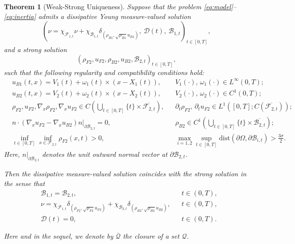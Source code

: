 \documentclass[11pt,twoside,reqno]{amsart}
\numberwithin{equation}{section}
\numberwithin{figure}{section}
\newtheorem{theorem}{Theorem}[section]
\begin{document}
\begin{theorem}[Weak-Strong Uniqueness]\label{thm:Weak-strongUniqueness}
Suppose that the problem \eqref{eq:model}–\eqref{eq:inertia} admits a dissipative Young measure-valued solution 
\[
(\nu=\chi_{\mathcal{F}_{1,t}}\nu+\chi_{\mathcal{B}_{1,t}}\delta_{(\rho_{B1},\sqrt{\rho_{B1}}u_{B1})},~\mathcal{D}(t),~\mathcal{B}_{1,t})_{t\in[0,T]},
\]
and a strong solution 
\[
(\rho_{F2},u_{F2},\rho_{B2},u_{B2},\mathcal{B}_{2,t})_{t\in[0,T]},
\]
such that the following regularity and compatibility conditions hold:
\begin{equation}\label{eq:RestrictontestforstrongSolution}
\begin{aligned}
&u_{B1}(t,x)=V_1(t)+\omega_1(t)\times(x-X_1(t)), 
&&V_1(\cdot),\,\omega_1(\cdot)\in L^\infty(0,T);\\
&u_{B2}(t,x)=V_2(t)+\omega_2(t)\times(x-X_2(t)), 
&&V_2(\cdot),\,\omega_2(\cdot)\in C^1(0,T);\\
&\rho_{F2},u_{F2},\nabla_x\rho_{F2},\nabla_xu_{F2}\in C\!\left(\bigcup_{t\in[0,T]}\{t\}\times\overline{\mathcal{F}_{2,t}}\right), 
&&\partial_t\rho_{F2},\,\partial_tu_{F2}\in L^1\!\left([0,T];C(\overline{\mathcal{F}_{2,t}})\right);\\
&n\cdot(\nabla_xu_{F2}-\nabla_xu_{B2}) n\big|_{\partial\mathcal{B}_{2,t}}=0, 
&&\rho_{B2}\in C^1\!\left(\bigcup_{t\in[0,T]}\{t\}\times\overline{\mathcal{B}_{2,t}}\right);\\
&\inf_{t\in[0,T]}\inf_{x\in\mathcal{F}_{2,t}}\rho_{F2}(x,t)>0, 
&&\max_{i=1,2}\sup_{t\in[0,T]}\mathrm{dist}(\partial\Omega,\partial\mathcal{B}_{i,t})>\tfrac{3\sigma}{2}.
\end{aligned}
\end{equation}
Here, $n|_{\partial\mathcal{B}_{2,t}}$ denotes the unit outward normal vector at $\partial\mathcal{B}_{2,t}$.  

Then the dissipative measure-valued solution coincides with the strong solution in the sense that
\begin{equation}
\begin{aligned}
&\mathcal{B}_{1,t}=\mathcal{B}_{2,t}, &&t\in(0,T),\\
&\nu=\chi_{\mathcal{F}_{1,t}}\delta_{(\rho_{F2},\sqrt{\rho_{F2}}u_{F2})}
+\chi_{\mathcal{B}_{2,t}}\delta_{(\rho_{B2},\sqrt{\rho_{B2}}u_{B2})}, &&t\in(0,T),\\
&\mathcal{D}(t)=0, &&t\in(0,T).
\end{aligned}
\end{equation}

Here and in the sequel, we denote by $\overline{\mathcal{Q}}$ the closure of a set $\mathcal{Q}$.
\end{theorem}
\end{document}
